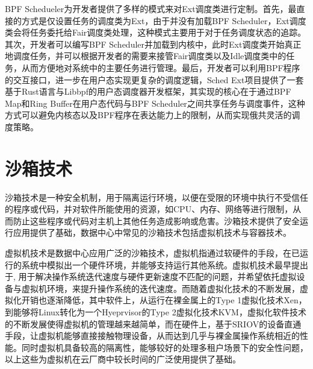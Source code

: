 BPF Schedueler为开发者提供了多样的模式来对Ext调度类进行定制。首先，最直接的方式是仅设置任务的调度类为Ext，由于并没有加载BPF Scheduler，Ext调度类会将任务委托给Fair调度类处理，这种模式主要用于对于任务调度状态的追踪。其次，开发者可以编写BPF Scheduler并加载到内核中，此时Ext调度类开始真正地调度任务，并可以根据开发者的需要来接管Fair调度类以及Idle调度类中的任务，从而方便地对系统中的主要任务进行管理。最后，开发者可以利用BPF程序的交互接口，进一步在用户态实现更复杂的调度逻辑，Sched Ext项目提供了一套基于Rust语言与Libbpf的用户态调度器开发框架，其实现的核心在于通过BPF Map和Ring Buffer在用户态代码与BPF Scheduler之间共享任务与调度事件，这种方式可以避免内核态以及BPF程序在表达能力上的限制，从而实现俄共灵活的调度策略。

\section{沙箱技术}


沙箱技术是一种安全机制，用于隔离运行环境，以便在受限的环境中执行不受信任的程序或代码，并对软件所能使用的资源，如CPU、内存、网络等进行限制，从而防止这些程序或代码对主机上其他任务造成影响或危害。沙箱技术提供了安全运行应用提供了基础，数据中心中常见的沙箱技术包括虚拟机技术与容器技术。

虚拟机技术是数据中心应用广泛的沙箱技术，虚拟机指通过软硬件的手段，在已运行的系统中模拟出一个硬件环境，并能够支持运行其他系统。虚拟机技术最早提出于\citep{bugnion1997disco}, 用于解决操作系统迭代速度与硬件更新速度不匹配的问题，并希望依托虚拟设备与虚拟机环境，来提升操作系统的迭代速度。而随着虚拟化技术的不断发展，虚拟化开销也逐渐降低，其中软件上，从运行在裸金属上的Type 1虚拟化技术Xen\citep{barham2003xen}，到能够将Linux转化为一个Hyeprvisor的Type 2虚拟化技术KVM\citep{kivity2007kvm}，虚拟化软件技术的不断发展使得虚拟机的管理越来越简单，而在硬件上，基于SRIOV的设备直通手段\citep{dong2012high}，让虚拟机能够直接接触物理设备，从而达到几乎与裸金属操作系统相近的性能。同时虚拟机具备较高的隔离性，能够较好的处理多租户场景下的安全性问题，以上这些为虚拟机在云厂商中较长时间的广泛使用提供了基础。

